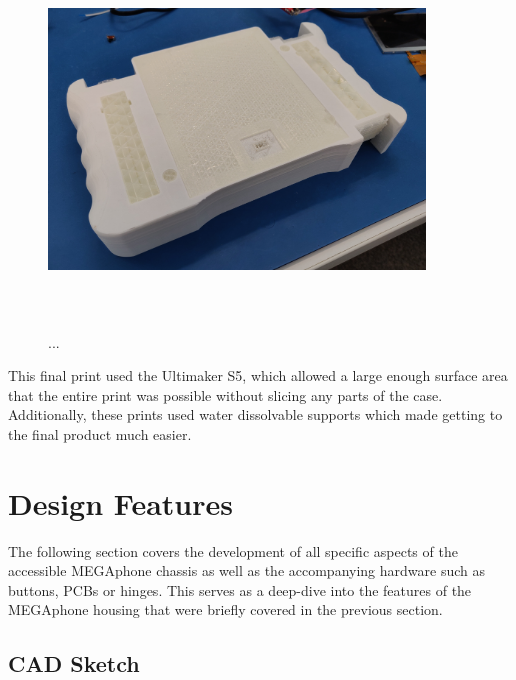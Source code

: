 \begin{figure} [h]
    \centering
    \includegraphics[width=10cm,height=10cm,keepaspectratio]{Figures/bottomwatersupport.jpg}
    \caption{...}
    \label{fig:thirdbottom}
\end{figure}

This final print used the Ultimaker S5, which allowed a large enough surface area that the entire print was possible without slicing any parts of the case.
Additionally, these prints used water dissolvable supports which made getting to the final product much easier.

\section{Design Features}

The following section covers the development of all specific aspects of the accessible MEGAphone chassis as well as the accompanying hardware such as buttons, PCBs or hinges.
This serves as a deep-dive into the features of the MEGAphone housing that were briefly covered in the previous section.

\subsection{CAD Sketch}

